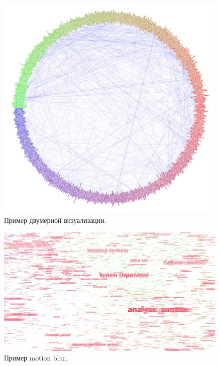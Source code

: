 \begin{figure}[h]
  \centering
  \includegraphics[width=\textwidth]{shots/circle.png}
  \caption{Пример двумерной визуализации.}
\end{figure}


\begin{figure}[h]
  \centering
  \includegraphics[width=\textwidth]{shots/motion.png}
  \caption{Пример motion blur.}
\end{figure}


